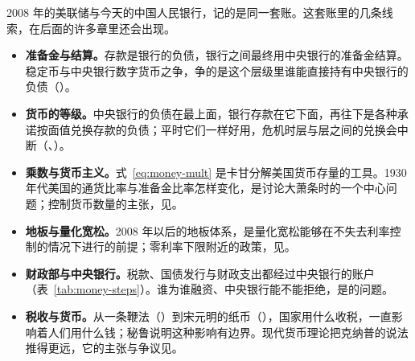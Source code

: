 2008 年的美联储与今天的中国人民银行，记的是同一套账。这套账里的几条线索，在后面的许多章里还会出现。
\begin{itemize}
\item \textbf{准备金与结算。}存款是银行的负债，银行之间最终用中央银行的准备金结算。稳定币与中央银行数字货币之争，争的是这个层级里谁能直接持有中央银行的负债（）。

\item \textbf{货币的等级。}中央银行的负债在最上面，银行存款在它下面，再往下是各种承诺按面值兑换存款的负债；平时它们一样好用，危机时层与层之间的兑换会中断（、）。

\item \textbf{乘数与货币主义。}式~\eqref{eq:money-mult} 是卡甘分解美国货币存量的工具。1930 年代美国的通货比率与准备金比率怎样变化，是讨论大萧条时的一个中心问题；控制货币数量的主张，见。

\item \textbf{地板与量化宽松。}2008 年以后的地板体系，是量化宽松能够在不失去利率控制的情况下进行的前提；零利率下限附近的政策，见。

\item \textbf{财政部与中央银行。}税款、国债发行与财政支出都经过中央银行的账户（表~\ref{tab:money-steps}）。谁为谁融资、中央银行能不能拒绝，是的问题。

\item \textbf{税收与货币。}从一条鞭法（）到宋元明的纸币（），国家用什么收税，一直影响着人们用什么钱；秘鲁说明这种影响有边界。现代货币理论把克纳普的说法推得更远，它的主张与争议见。
\end{itemize}

